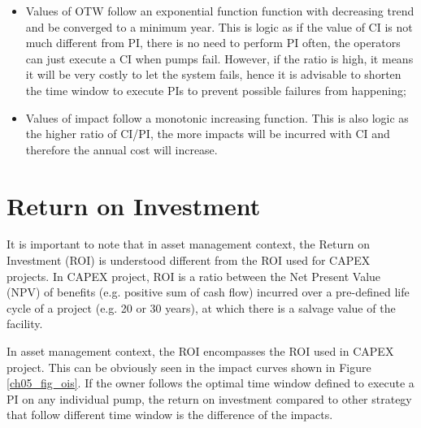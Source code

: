 \begin{itemize}
	\item Values of OTW follow an exponential function function with decreasing trend and be converged to a minimum year. This is logic as if the value of CI is not much different from PI, there is no need to perform PI often, the operators can just execute a CI when pumps fail. However, if the ratio is high, it means it will be very costly to let the system fails, hence it is advisable to shorten the time window to execute PIs to prevent possible failures from happening;

	\item Values of impact follow a monotonic increasing function. This is also logic as the higher ratio of CI/PI, the more impacts will be incurred with CI and therefore the annual cost will increase. 
\end{itemize}

\section{Return on Investment}
It is important to note that in asset management context, the Return on Investment (ROI) is understood different from the ROI used for CAPEX projects. In CAPEX project, ROI is a ratio between the Net Present Value (NPV) of benefits (e.g. positive sum of cash flow) incurred over a pre-defined life cycle of a project (e.g. 20 or 30 years), at which there is a salvage value of the facility. 

In asset management context, the ROI encompasses the ROI used in CAPEX project. This can be obviously seen in the impact curves shown in Figure \ref{ch05_fig_ois}. If the owner follows the optimal time window defined to execute a PI on any individual pump, the return on investment compared to other strategy that follow different time window is the difference of the impacts.







